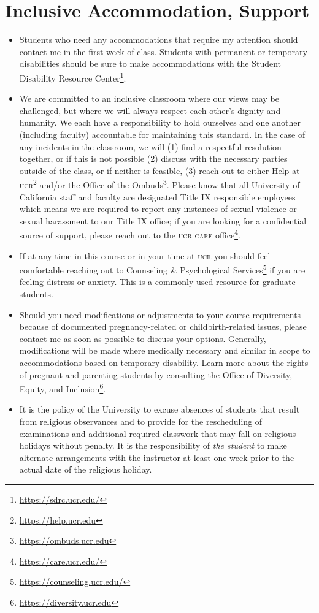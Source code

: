 \documentclass[12pt]{article}
\numberwithin{equation}{section}    %
\begin{document}
\section*{Inclusive Accommodation, Support}
\begin{itemize}
	\item Students who need any accommodations that require my attention should contact me in the first week of class. Students with permanent or temporary disabilities should be sure to make accommodations with the Student Disability Resource Center\footnote{\url{https://sdrc.ucr.edu/}}.

	\item We are committed to an inclusive classroom where our views may be challenged, but where we will always respect each other's dignity and humanity. We each have a responsibility to hold ourselves and one another (including faculty) accountable for maintaining this standard. In the case of any incidents in the classroom, we will (1) find a respectful resolution together, or if this is not possible (2) discuss with the necessary parties outside of the class, or if neither is feasible, (3) reach out to either {Help at \textsc{ucr}}\footnote{\url{https://help.ucr.edu}} and/or the {Office of the Ombuds}\footnote{\url{https://ombuds.ucr.edu}}. Please know that all University of California staff and faculty are designated Title IX responsible employees which means we are required to report any instances of sexual violence or sexual harassment to our Title IX office; if you are looking for a confidential source of support, please reach out to the \textsc{ucr care} office\footnote{\url{https://care.ucr.edu/}}.

	\item If at any time in this course or in your time at \textsc{ucr} you should feel comfortable reaching out to Counseling \& Psychological Services\footnote{\url{https://counseling.ucr.edu/}} if you are feeling distress or anxiety. This is a commonly used resource for graduate students.

	\item Should you need modifications or adjustments to your course requirements because of documented pregnancy-related or childbirth-related issues, please contact me as soon as possible to discuss your options. Generally, modifications will be made where medically necessary and similar in scope to accommodations based on temporary disability.  Learn more about the rights of pregnant and parenting students by consulting the Office of Diversity, Equity, and Inclusion\footnote{\url{https://diversity.ucr.edu}}.

	\item It is the policy of the University to excuse absences of students that result from religious observances and to provide for the rescheduling of examinations and additional required classwork that may fall on religious holidays without penalty. It is the responsibility of \emph{the student} to make alternate arrangements with the instructor at least one week prior to the actual date of the religious holiday.
\end{itemize}
\end{document}
